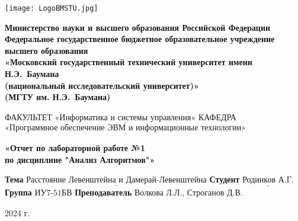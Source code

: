 
\newcommand{\Cafedra}{«Программное обеспечение ЭВМ и информационные технологии»}
\newcommand{\Facultet}{«Информатика и системы управления»}

\newcommand{\TeacherPosition}{должность}
\newcommand{\mainTeacherData}{Волкова Л.Л.}
\newcommand{\fullTeachersData}{Волкова Л.Л., Строганов Д.В.}

\newcommand{\labNumber}{№}
\newcommand{\labName}{}
\newcommand{\labCourse}{Анализ Алгоритмов}
\newcommand{\labTheme}{Расстояние Левенштейна и Дамерай-Левенштейна}
\newcommand{\studentGroup}{ИУ7-51БВ}
\newcommand{\studentName}{Родинков А.Г.}




	
	\begin{center}
		\noindent
		\begin{minipage}{0.185\textwidth}
			
			\texttt{[image: LogoBMSTU.jpg]} %
		\end{minipage}%
		\begin{minipage}{0.88\textwidth}
			\centering
			{\fontsize{13}{8}\selectfont
				\textbf{Министерство науки и высшего образования Российской Федерации}\\
				{\setlength{\parindent}{2em} 
				\textbf{Федеральное государственное бюджетное образовательное учреждение высшего образования}\\
				}
				\textbf{«Московский государственный технический университет имени Н.Э.~Баумана}\\
				\textbf{(национальный исследовательский университет)»}\\
				\textbf{(МГТУ им. Н.Э.~Баумана)}
			}
		\end{minipage}
	\end{center}
	
	\vspace{1cm}
	
	\noindent ФАКУЛЬТЕТ $\underline{\text{\Facultet}}$ \n
	\noindent КАФЕДРА $\underline{\text{\Cafedra}}$
	
	
	\vspace{5cm}
	
	\begin{center}
		{\noindent
			{\fontsize{21}{10}\selectfont
				{\setlength{\parindent}{2em}
				\textbf{«Отчет по лабораторной работе {\labNumber}1}\\
				}
				\textbf{по дисциплине "{\labCourse}"»}\n
			}
		}
	\end{center}
	
	\vspace{6cm}
	
	\noindent\textbf{Тема} 			$\underline{\text{\labTheme}}$\n
	\noindent\textbf{Студент} 		$\underline{\text{\studentName}}$\n
	\noindent\textbf{Группа} 		$\underline{\text{\studentGroup}}$\n
	\noindent\textbf{Преподаватель} $\underline{\text{\fullTeachersData}}$\n
		
	\begin{center}
		\vfill 2024 г.
	\end{center}
